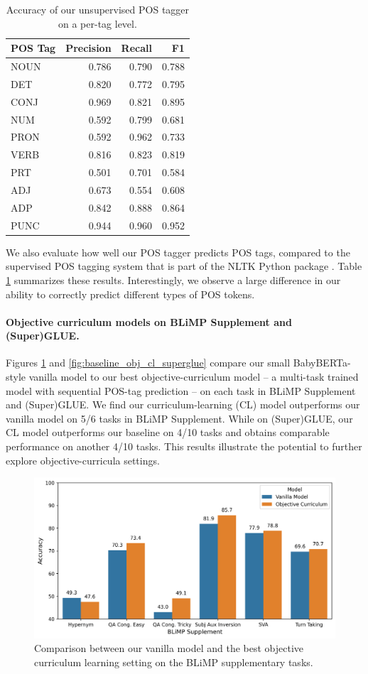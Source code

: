\begin{table}[h]
\begin{tabular}{lrrr}
\toprule
POS Tag & Precision & Recall & F1 \\
\midrule
NOUN & 0.786 & 0.790 & 0.788 \\
DET & 0.820 & 0.772 & 0.795 \\
CONJ & 0.969 & 0.821 & 0.895 \\
NUM & 0.592 & 0.799 & 0.681 \\
PRON & 0.592 & 0.962 & 0.733 \\   
VERB & 0.816 & 0.823 & 0.819 \\
PRT & 0.501 & 0.701 & 0.584 \\
ADJ & 0.673 & 0.554 & 0.608 \\
ADP & 0.842 & 0.888 & 0.864 \\
PUNC & 0.944 & 0.960 & 0.952 \\
\bottomrule
\end{tabular}
\caption{\label{tbl:unsupervised-pos-performance} Accuracy of our unsupervised POS tagger on a per-tag level.}
\end{table}


We also evaluate how well our POS tagger predicts POS tags, compared to the  supervised POS tagging system that is part of the NLTK Python package \cite{bird2009natural}. Table \ref{tbl:unsupervised-pos-performance} summarizes these results. Interestingly, we observe a large difference in our ability to correctly predict different types of POS tokens.

\paragraph{Objective curriculum models on BLiMP Supplement and (Super)GLUE.} Figures \ref{fig:baseline_obj_cl_blimp_supp} and \ref{fig:baseline_obj_cl_superglue} compare our small BabyBERTa-style vanilla  model to our best objective-curriculum model -- a multi-task trained model with sequential POS-tag prediction -- on each task in BLiMP Supplement and (Super)GLUE. We find our curriculum-learning (CL) model outperforms our vanilla model on 5/6 tasks in BLiMP Supplement. While on (Super)GLUE, our CL model outperforms our baseline on 4/10 tasks and obtains comparable performance on another 4/10 tasks. This results illustrate the potential to further explore objective-curricula settings.

\begin{figure}[h]
\centering
\includegraphics[width=0.5 \textwidth]{chapters/climb/figures/baseline_vs_obj_cl_blimp_supp_new.png}
\caption{\label{fig:baseline_obj_cl_blimp_supp} Comparison between our vanilla model and the best objective curriculum learning setting on the BLiMP supplementary tasks.}
\end{figure}

